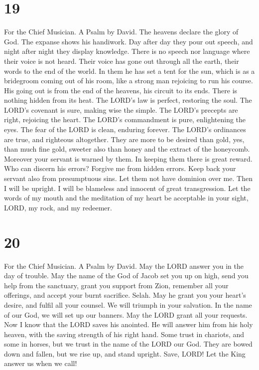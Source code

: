 \hypertarget{section-18}{%
\section{19}\label{section-18}}

For the Chief Musician. A Psalm by David.  The heavens
declare the glory of God. The expanse shows his handiwork.
 Day after day they pour out speech, and night after night
they display knowledge.  There is no speech nor language
where their voice is not heard.  Their voice has gone out
through all the earth, their words to the end of the world. In them he
has set a tent for the sun,  which is as a bridegroom
coming out of his room, like a strong man rejoicing to run his course.
 His going out is from the end of the heavens, his circuit
to its ends. There is nothing hidden from its heat.  The
LORD's law is perfect, restoring the soul. The LORD's covenant is sure,
making wise the simple.  The LORD's precepts are right,
rejoicing the heart. The LORD's commandment is pure, enlightening the
eyes.  The fear of the LORD is clean, enduring forever.
The LORD's ordinances are true, and righteous altogether.
 They are more to be desired than gold, yes, than much
fine gold, sweeter also than honey and the extract of the honeycomb.
 Moreover your servant is warned by them. In keeping them
there is great reward.  Who can discern his errors?
Forgive me from hidden errors.  Keep back your servant
also from presumptuous sins. Let them not have dominion over me. Then I
will be upright. I will be blameless and innocent of great
transgression.  Let the words of my mouth and the
meditation of my heart be acceptable in your sight, LORD, my rock, and
my redeemer.

\hypertarget{section-19}{%
\section{20}\label{section-19}}

For the Chief Musician. A Psalm by David.  May the LORD
answer you in the day of trouble. May the name of the God of Jacob set
you up on high,  send you help from the sanctuary, grant
you support from Zion,  remember all your offerings, and
accept your burnt sacrifice. Selah.  May he grant you your
heart's desire, and fulfil all your counsel.  We will
triumph in your salvation. In the name of our God, we will set up our
banners. May the LORD grant all your requests.  Now I know
that the LORD saves his anointed. He will answer him from his holy
heaven, with the saving strength of his right hand.  Some
trust in chariots, and some in horses, but we trust in the name of the
LORD our God.  They are bowed down and fallen, but we rise
up, and stand upright.  Save, LORD! Let the King answer us
when we call!

